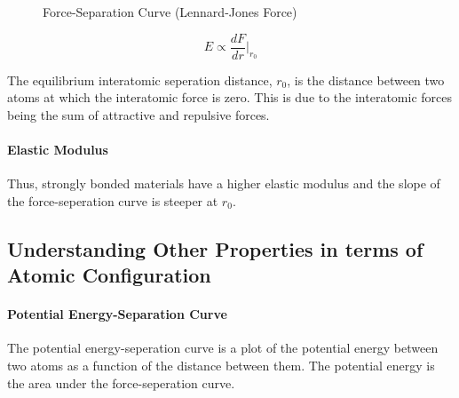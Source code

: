 \documentclass[11pt]{article}
\begin{document}
\begin{figure}[h]
    \centering
    \caption{Force-Separation Curve (Lennard-Jones Force)}
    \label{fig:force-separation}
\end{figure}
\begin{equation}
    E \propto \frac{dF}{dr} \Bigg|_{r_0}
\end{equation}
\begin{definition}
The equilibrium interatomic seperation distance, $r_0$, is the distance between two atoms at which the interatomic force is zero. This is due to the interatomic forces being the sum of attractive and repulsive forces.
\end{definition}
\paragraph{Elastic Modulus} Thus, strongly bonded materials have a higher elastic modulus and the slope of the force-seperation curve is steeper at $r_0$.
\subsection{Understanding Other Properties in terms of Atomic Configuration}
\paragraph{Potential Energy-Separation Curve} The potential energy-seperation curve is a plot of the potential energy between two atoms as a function of the distance between them. The potential energy is the area under the force-seperation curve.
\end{document}
